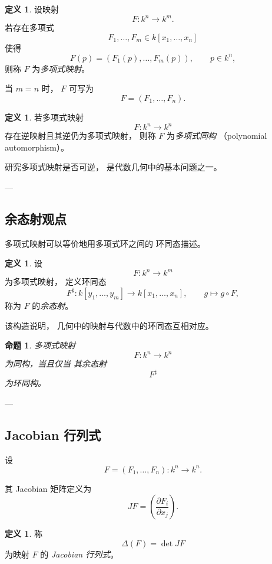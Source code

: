 \documentclass[11pt]{article}
\theoremstyle{plain}
\newtheorem{proposition}[theorem]{命题}
\theoremstyle{definition}
\newtheorem{definition}[theorem]{定义}
\theoremstyle{remark}
\renewcommand{\det}{\operatorname{det}}
\begin{document}
\begin{definition}
    设映射
    \[
        F:k^n\to k^m.
    \]
    若存在多项式
    \[
        F_1,\dots,F_m\in k[x_1,\dots,x_n]
    \]
    使得
    \[
        F(p)=(F_1(p),\dots,F_m(p)),
        \qquad p\in k^n,
    \]
    则称 $F$ 为\emph{多项式映射}。
\end{definition}

当 $m=n$ 时，
$F$ 可写为
\[
    F=(F_1,\dots,F_n).
\]

\begin{definition}
    若多项式映射
    \[
        F:k^n\to k^n
    \]
    存在逆映射且其逆仍为多项式映射，
    则称 $F$ 为\emph{多项式同构}
    （polynomial automorphism）。
\end{definition}

研究多项式映射是否可逆，
是代数几何中的基本问题之一。

---

\subsection{余态射观点}

多项式映射可以等价地用多项式环之间的
环同态描述。

\begin{definition}
    设
    \[
        F:k^n\to k^m
    \]
    为多项式映射，
    定义环同态
    \[
        F^\sharp:
        k[y_1,\dots,y_m]\to k[x_1,\dots,x_n],
        \qquad
        g\mapsto g\circ F,
    \]
    称为 $F$ 的\emph{余态射}。
\end{definition}

该构造说明，
几何中的映射与代数中的环同态互相对应。

\begin{proposition}
    多项式映射
    \[
        F:k^n\to k^n
    \]
    为同构，当且仅当
    其余态射
    \[
        F^\sharp
    \]
    为环同构。
\end{proposition}

---

\subsection{Jacobian 行列式}

设
\[
    F=(F_1,\dots,F_n):k^n\to k^n.
\]

其 Jacobian 矩阵定义为
\[
    JF=
    \left(
    \frac{\partial F_i}{\partial x_j}
    \right).
\]

\begin{definition}
    称
    \[
        \Delta(F)=\det JF
    \]
    为映射 $F$ 的
    \emph{Jacobian 行列式}。
\end{definition}
\end{document}
